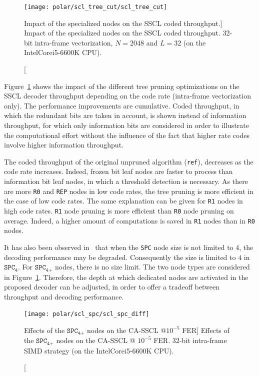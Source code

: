 \begin{figure}[htp]
  \centering
  \texttt{[image: polar/scl\_tree\_cut/scl\_tree\_cut]}
  \caption
    [Impact of the specialized nodes on the SSCL coded throughput.]
    {Impact of the specialized nodes on the SSCL coded throughput.
    32-bit intra-frame vectorization, $N=2048$ and $L=32$
    (on the Intel\R Core\TM i5-6600K CPU).}
  \label{plot:opt_polar_scl_tree_cut}
\end{figure}

Figure~\ref{plot:opt_polar_scl_tree_cut} shows the impact of the different tree
pruning optimizations on the SSCL decoder throughput depending on the code
rate (intra-frame vectorization only). The performance improvements are
cumulative. Coded throughput, in which the redundant bits are taken in account,
is shown instead of information throughput, for which only information bits are
considered in order to illustrate the computational effort without the influence
of the fact that higher rate codes involve higher information throughput.

The coded throughput of the original unpruned algorithm (\verb|ref|), decreases
as the code rate increases. Indeed, frozen bit leaf nodes are faster to process
than information bit leaf nodes, in which a threshold detection is necessary. As
there are more \verb|R0| and \verb|REP| nodes in low code rates, the tree
pruning is more efficient in the case of low code rates. The same explanation
can be given for \verb|R1| nodes in high code rates. \verb|R1| node pruning is
more efficient than \verb|R0| node pruning on average. Indeed, a higher amount
of computations is saved in \verb|R1| nodes than in \verb|R0| nodes.

It has also been observed in~\cite{Sarkis2016} that when the \verb|SPC| node
size is not limited to $4$, the decoding performance may be degraded.
Consequently the size is limited to $4$ in $\texttt{SPC}_\texttt{4}$. For
$\texttt{SPC}_\texttt{4+}$ nodes, there is no size limit. The two node types are
considered in Figure~\ref{plot:opt_polar_scl_tree_cut}. Therefore, the depth at
which dedicated nodes are activated in the proposed decoder can be adjusted, in
order to offer a tradeoff between throughput and decoding performance.

\begin{figure}[htp]
  \centering
  \texttt{[image: polar/scl\_spc/scl\_spc\_diff]}
  \caption
    [Effects of the $\texttt{SPC}_\texttt{4+}$ nodes on the CA-SSCL @$10^{-5}$
     FER]
    {Effects of the $\texttt{SPC}_\texttt{4+}$ nodes on the CA-SSCL @ $10^{-5}$
     FER. 32-bit intra-frame SIMD strategy (on the Intel\R Core\TM i5-6600K
     CPU).}
  \label{plot:opt_polar_scl_spc}
\end{figure}

